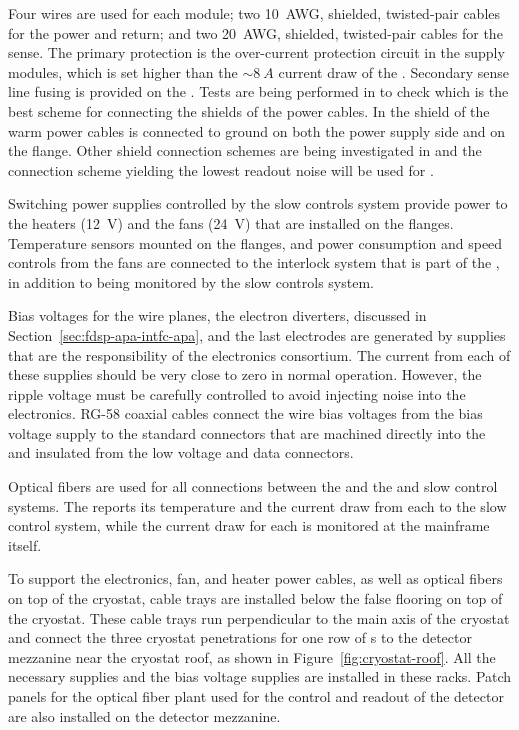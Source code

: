 Four wires are used for each  module; two \SI{10}{AWG}, shielded, twisted-pair 
cables for the power and return; and two \SI{20}{AWG}, shielded, twisted-pair 
cables for the sense. The primary protection is the over-current 
protection circuit in the  supply modules, which is set 
higher than the $\sim\SI{8}{A}$ current draw of the . 
Secondary sense line fusing is provided on the .  
Tests are being performed in  to check which is the
best scheme for connecting the shields of the power cables. In
 the shield of the warm power cables is connected to
ground on both the power supply side and on the  flange.
Other shield connection schemes are being investigated in 
and the connection scheme yielding the lowest readout noise will be
used for .

Switching power supplies controlled by the slow controls system provide
power to the heaters (\SI{12}{V}) and the fans (\SI{24}{V}) that are 
installed on the  flanges. Temperature sensors mounted on the
flanges, and power consumption and speed controls from the fans are 
connected to the interlock system that is part of the , in
addition to being monitored by the slow controls system.

Bias voltages for the  wire planes, the electron diverters,
discussed in Section~\ref{sec:fdsp-apa-intfc-apa}, 
and the last  electrodes are generated by supplies that are 
the responsibility of the  electronics consortium.  The 
current from each of these supplies should be very close to zero in 
normal operation. However, the ripple voltage must be carefully 
controlled to avoid injecting noise into the  electronics.  
RG-58 coaxial cables connect the wire bias voltages from the bias voltage
supply to the standard  connectors that are machined directly 
into the  \fdth and insulated from the low voltage and 
data connectors.

Optical fibers are used for all connections between the  %
and the  and slow 
control systems.  The  reports its temperature 
and the current draw from each  to the slow control system, 
while the current draw for each  is monitored at the 
mainframe itself.

To support the electronics, fan, and heater power cables, as well 
as optical fibers on top of the cryostat, cable trays are installed
below the false flooring on top of the cryostat. These cable trays
run perpendicular to the main axis of the cryostat and connect the
three cryostat penetrations for one row of s to the detector
mezzanine near the cryostat roof, as shown in Figure~\ref{fig:cryostat-roof}.
All the necessary  supplies and %
the bias
voltage supplies are installed in these racks. Patch panels for
the optical fiber plant used for the control and readout of the
detector are also installed on the detector mezzanine.

